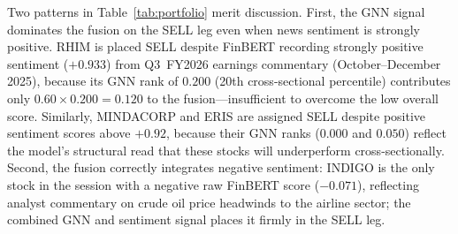 \documentclass[a4paper,11pt]{report}
\begin{document}
\begin{table}[h!]
\centering
\small
\caption{Live portfolio allocation for 25~May~2026 ($\alpha{=}0.60$). GNN Rank and Fusion Score lie in $[0,1]$ (1 = top cross-sectional percentile). Raw Sentiment is the FinBERT score in $[-1,1]$; ``---'' denotes zero news coverage. All tickers are NSE-listed.}
\label{tab:portfolio}
\end{table}

Two patterns in Table~\ref{tab:portfolio} merit discussion. First, the GNN signal dominates the fusion on the SELL leg even when news sentiment is strongly positive. RHIM is placed SELL despite FinBERT recording strongly positive sentiment ($+0.933$) from Q3~FY2026 earnings commentary (October--December 2025), because its GNN rank of $0.200$ (20th cross-sectional percentile) contributes only $0.60\times0.200 = 0.120$ to the fusion---insufficient to overcome the low overall score. Similarly, MINDACORP and ERIS are assigned SELL despite positive sentiment scores above $+0.92$, because their GNN ranks ($0.000$ and $0.050$) reflect the model's structural read that these stocks will underperform cross-sectionally. Second, the fusion correctly integrates negative sentiment: INDIGO is the only stock in the session with a negative raw FinBERT score ($-0.071$), reflecting analyst commentary on crude oil price headwinds to the airline sector; the combined GNN and sentiment signal places it firmly in the SELL leg.
\end{document}

